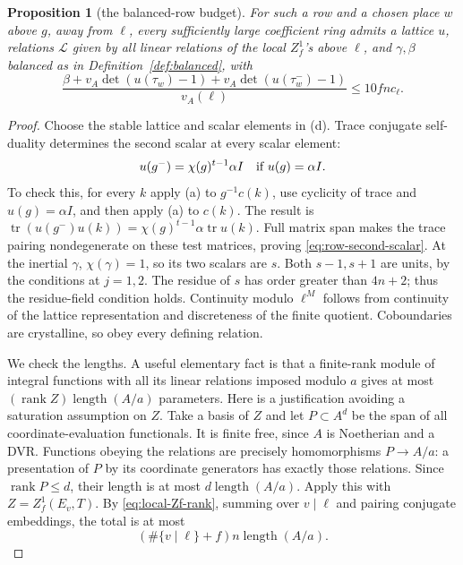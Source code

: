 \documentclass[11pt,a4paper]{article}
\newtheorem{proposition}[theorem]{Proposition}
\theoremstyle{definition}
\newcommand{\length}{\operatorname{length}}
\begin{document}
\begin{proposition}[the balanced-row budget]\label{prop:row-balanced}
For such a row and a chosen place \(w\) above \(g\),
away from \(\ell\), every sufficiently large
coefficient ring admits a lattice \(u\), relations
\(\mathcal L\) given by all linear relations of the
local \(Z_f^1\)'s above \(\ell\), and
\(\gamma,\beta\) balanced as in
Definition~\ref{def:balanced}, with
\[
 \frac{\beta+
       v_A\det(u(\tau_w)-1)+v_A\det(u(\tau_w^-)-1)}
                {v_A(\ell)}
             \le10fn c_\ell .
\]
\end{proposition}
\begin{proof}
Choose the stable lattice and scalar elements in
(d). Trace conjugate self-duality determines the
second scalar at every scalar element:
\begin{equation}\label{eq:row-second-scalar}
 u(g^-)=\chi(g)^{t-1}\alpha I
              \quad\hbox{if }u(g)=\alpha I .
\end{equation}
To check this, for every \(k\) apply (a) to
\(g^{-1}c(k)\), use cyclicity of trace and
\(u(g)=\alpha I\), and then apply (a) to \(c(k)\).
The result is
\(\operatorname{tr}(u(g^-)u(k))
 =\chi(g)^{t-1}\alpha\operatorname{tr}u(k)\).
Full matrix span makes the trace pairing
nondegenerate on these test matrices, proving
\eqref{eq:row-second-scalar}.
At the inertial \(\gamma\), \(\chi(\gamma)=1\),
so its two scalars are \(s\).
Both \(s-1,s+1\) are units, by the conditions
at \(j=1,2\).
The residue of \(s\) has order greater than
\(4n+2\); thus the residue-field condition holds.
Continuity modulo \(\ell^M\) follows from continuity
of the lattice representation and discreteness
of the finite quotient. Coboundaries are
crystalline, so obey every defining relation.

We check the lengths. A useful elementary fact is
that a finite-rank module of integral functions
with all its linear relations imposed modulo
\(a\) gives at most
\((\operatorname{rank}Z)\length(A/a)\) parameters.
Here is a justification avoiding a saturation
assumption on \(Z\).
Take a basis of \(Z\) and let \(P\subset A^d\)
be the span of all coordinate-evaluation
functionals. It is finite free, since \(A\) is
Noetherian and a DVR. Functions obeying the
relations are precisely homomorphisms
\(P\to A/a\): a presentation of \(P\) by its
coordinate generators has exactly those
relations. Since \(\operatorname{rank}P\le d\),
their length is at most \(d\length(A/a)\).
Apply this with \(Z=Z_f^1(E_v,T)\).
By \eqref{eq:local-Zf-rank}, summing over \(v\mid\ell\)
and pairing conjugate embeddings, the total is at most
\[
 (\#\{v\mid\ell\}+f)n\length(A/a).
\]


\end{proof}
\end{document}
